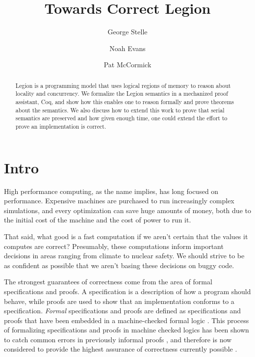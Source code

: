 \documentclass[sigconf]{acmart}
\begin{document}
\title{Towards Correct Legion}
\author{George Stelle}

\author{Noah Evans}

\author{Pat McCormick}

\begin{abstract}
Legion is a programming model that uses logical regions of memory to reason about 
locality and concurrency. We formalize the Legion semantics in a mechanized
proof assistant, Coq, and show how this enables one to reason formally and
prove theorems about the semantics. We also discuss how to extend this work to
prove that serial semantics are preserved and how given enough time, one could
extend the effort to prove an implementation is correct.
\end{abstract}

\maketitle

\section{Intro}
High performance computing, as the name implies, has long focused on
performance. Expensive machines are purchased to run increasingly complex
simulations, and every optimization can save huge amounts of money, both due to
the initial cost of the machine and the cost of power to run it. 

That said, what good is a fast computation if we aren't certain that the
values it computes are correct? Presumably, these computations inform important
decisions in areas ranging from climate to nuclear safety. We should strive to
be as confident as possible that we aren't basing these decisions on buggy
code.

The strongest guarantees of correctness come from the area of formal
specifications and proofs. A specification is a description of how a program
should behave, while proofs are used to show that an implementation conforms to
a specification. \emph{Formal} specifications and proofs are defined as
specifications and proofs that have been embedded in a machine-checked formal
logic \cite{Coq, isabelle...}. This process of formalizing specifications and
proofs in machine checked logics has been shown to catch common errors in
previously informal proofs \cite{papers}, and therefore is now considered
to provide the highest assurance of correctness currently possible \cite{?}.
\end{document}
